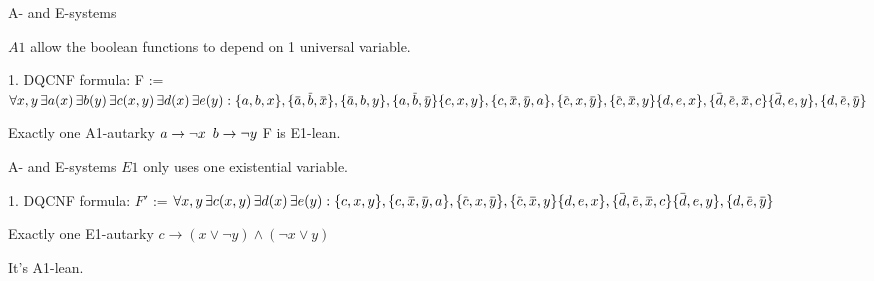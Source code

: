 \documentclass[xcolor=table	]{beamer}
\newcommand{\ov}[1]{\mkern 1.5mu\overline{\mkern-1.5mu#1\mkern-1.5mu}\mkern 1.5mu}
\begin{document}
\begin{frame}{A- and E-systems}

\vspace{0.2cm}
\only
 $A1$ allow the boolean functions to  
	depend on 1 universal variable. 
	
	\begin{alertblock}{1. DQCNF formula:}
		{		
		F :=	$ \forall x, y \, \exists a(x) \, \exists  b(y) \, \exists c(x,y) \, \exists d(x) \, \exists e(y) :
			\{a,b,x\}, \{\ov{a},\ov{b},\ov{x}\}, \{\ov{a},b,y\}, \{a,\ov{b},\ov{y}\}  \newline 
			\{c,x,y\}, \{c,\ov{x},\ov{y}, a\}, \{\ov{c},x,\ov{y}\}, \{\ov{c},\ov{x},y\} \newline 
			\{d,e,x\}, \{\ov{d},\ov{e},\ov{x}, c\} \{\ov{d},e,y\}, \{d,\ov{e},\ov{y}\} $
		}
	\end{alertblock}
    
    \begin{example}
    	Exactly one A1-autarky \newline 
    	 $a \to \neg x \newline$ 
    	 $b \to \neg y \newline$
    	 F is E1-lean.
    	 
    \end{example}
\end{frame}
    
\begin{frame}{A- and E-systems}
$E1$ only uses one existential variable. 
\begin{alertblock}{1. DQCNF formula:}
	{		
		$F'$ :=	$ \forall x, y \, \exists c(x,y) \, \exists d(x) \, \exists e(y) : \newline 
		\{c,x,y\}, \{c,\ov{x},\ov{y}, a\}, \{\ov{c},x,\ov{y}\}, \{\ov{c},\ov{x},y\} \newline 
		\{d,e,x\}, \{\ov{d},\ov{e},\ov{x}, c\} \{\ov{d},e,y\}, \{d,\ov{e},\ov{y}\} $
	}
\end{alertblock}

 \begin{example}
	Exactly one E1-autarky \newline 
	$c \to (x \lor \neg y) \land (\neg x \lor y)$
	
	It's A1-lean.
	
\end{example} 

\end{frame}
\end{document}
